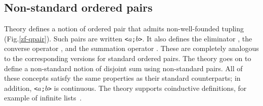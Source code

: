 \subsection{Non-standard ordered pairs}

Theory  defines a notion of ordered pair that admits
non-well-founded tupling (Fig.\ts\ref{zf-qpair}).  Such pairs are written
{\tt<$a$;$b$>}.  It also defines the eliminator , the
converse operator , and the summation operator
.  These are completely analogous to the corresponding
versions for standard ordered pairs.  The theory goes on to define a
non-standard notion of disjoint sum using non-standard pairs.  All of these
concepts satisfy the same properties as their standard counterparts; in
addition, {\tt<$a$;$b$>} is continuous.  The theory supports coinductive
definitions, for example of infinite lists~\cite{paulson-mscs}.

